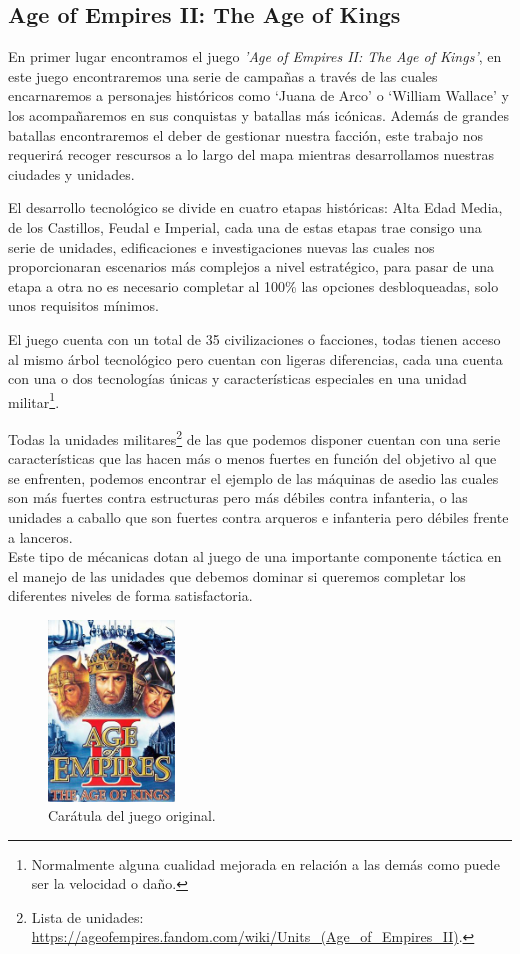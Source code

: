 \subsection{Age of Empires II: The Age of Kings}
En primer lugar encontramos el juego \textit{'Age of Empires II: The Age of Kings'}, en
este juego encontraremos una serie de campañas a través de las cuales encarnaremos a personajes
históricos como `Juana de Arco' o `William Wallace' y los acompañaremos en sus conquistas y
batallas más icónicas. Además de grandes batallas encontraremos el deber de gestionar nuestra
facción, este trabajo nos requerirá recoger rescursos a lo largo del mapa mientras desarrollamos 
nuestras ciudades y unidades.

El desarrollo tecnológico se divide en cuatro etapas históricas: Alta Edad Media,
de los Castillos, Feudal e Imperial, cada una de estas etapas trae consigo una serie de
unidades, edificaciones e investigaciones nuevas las cuales nos proporcionaran escenarios
más complejos a nivel estratégico, para pasar de una etapa a otra no es necesario completar
al 100\% las opciones desbloqueadas, solo unos requisitos mínimos.

El juego cuenta con un total de 35 civilizaciones o facciones, todas tienen acceso al mismo árbol
tecnológico pero cuentan con ligeras diferencias, cada una cuenta con una o dos tecnologías únicas
y características especiales en una unidad militar\footnote{Normalmente alguna cualidad mejorada en relación a las
demás como puede ser la velocidad o daño.}.

Todas la unidades militares\footnote{Lista de unidades: \url{https://ageofempires.fandom.com/wiki/Units_(Age_of_Empires_II)}.}
de las que podemos disponer cuentan con una serie características que
las hacen más o menos fuertes en función del objetivo al que se enfrenten, podemos encontrar
el ejemplo de las máquinas de asedio las cuales son más fuertes contra estructuras pero
más débiles contra infanteria, o las unidades a caballo que son fuertes contra arqueros
e infanteria pero débiles frente a lanceros. \\
Este tipo de mécanicas dotan al juego de una importante componente táctica en el manejo
de las unidades que debemos dominar si queremos completar los diferentes niveles de
forma satisfactoria.

\begin{figure}[ht]
\centering
\includegraphics[width=0.3\textwidth]{imagenes/marco_teo/referentes/aoe_1.png}
\caption{Carátula del juego original.}
\label{img:aoe_1}
\end{figure}

